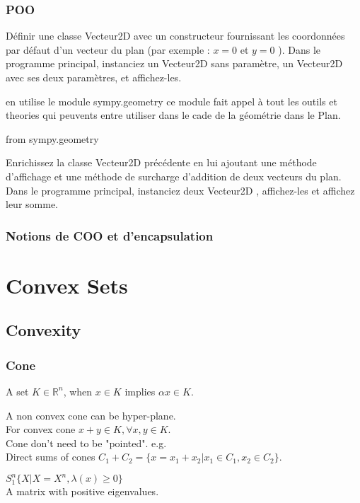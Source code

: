\documentclass[11pt,fleqn]{book} %
\def\R{\mathbb{R}}
\begin{document}
 \subsection{POO}
\begin{exercise}
 Définir une classe Vecteur2D avec un constructeur fournissant les coordonnées par
défaut d’un vecteur du plan (par exemple : $x = 0$ et $y = 0$ ).
Dans le programme principal, instanciez un Vecteur2D sans paramètre, un Vecteur2D
avec ses deux paramètres, et affichez-les.
\end{exercise}
\begin{solution}
 en utilise le module sympy.geometry ce module fait appel à tout les outils et theories qui
 peuvents entre utiliser dans le cade de la géométrie dans le Plan.
 \begin{python}
 from sympy.geometry
  \end{python}
\end{solution}

\begin{exercise}
Enrichissez la classe Vecteur2D précédente en lui ajoutant une méthode d’affichage
et une méthode de surcharge d’addition de deux vecteurs du plan.
Dans le programme principal, instanciez deux Vecteur2D , affichez-les et affichez leur
somme.
\end{exercise}
\begin{solution}
\end{solution}

\subsection{Notions de COO et d’encapsulation}

\chapter{Convex Sets}
\section{Convexity}
\subsection{Cone}
\begin{definition}[Cone]
A set $K \in \R^n$, when $x \in K $ implies $\alpha x \in K$.
\end{definition}
A non convex cone can be hyper-plane.\\
For convex cone $x + y \in K, \forall x,y \in K$.\\
Cone don't need to be "pointed". e.g. \\
Direct sums of cones $C_1 + C_2 = \{ x = x_1+x_2 | x_1 \in C_1, x_2 \in C_2 \}$.\\
\begin{example}
$S_1^n  \{ X | X=X^n ,\lambda(x) \ge 0\}$\\
A matrix with positive eigenvalues.
\end{example}
\end{document}
